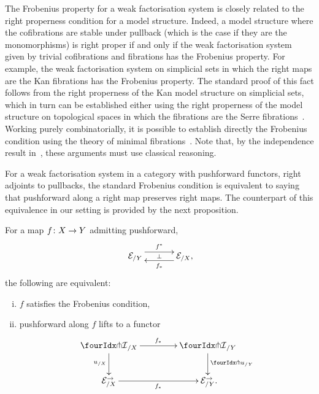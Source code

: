 \documentclass[reqno,10pt,a4paper,oneside,draft]{amsart}
\begin{document}
\begin{remark}
The Frobenius property for a weak factorisation system is closely related to the right properness condition for a model structure.
Indeed, a model structure where the cofibrations are stable under pullback (which is the case if they are the monomorphisms) is right proper if and only if the weak factorisation system given by trivial cofibrations and fibrations has the Frobenius property.
For example, the weak factorisation system on simplicial sets in which the right maps are the Kan fibrations has the Frobenius property.
The standard proof of this fact follows from the right properness of the Kan model structure on simplicial sets, which in turn can be established either using the right properness of the model structure on topological spaces in which the fibrations are the Serre fibrations~\cite[Theorem~13.1.13]{hirschhorn-model-localizations}.
Working purely combinatorially, it is possible to establish directly the Frobenius condition using the theory of minimal fibrations~\cite[Theorem~1.7.1]{joyal-tierney-notes}.
Note that, by the independence result in~\cite{coquand-non-constructivity-kan}, these arguments must use classical reasoning.
\end{remark}

\medskip

For a weak factorisation system in a category with pushforward functors, \ie right adjoints to pullbacks, the standard Frobenius condition is equivalent to saying that pushforward along a right map preserves right maps.
The counterpart of this equivalence in our setting is provided by the next proposition.

\begin{proposition} \label{lift-dependent-product}
For a map $f \colon X \to Y$ admitting pushforward,
\[
\xymatrix@C+1em{
  \catE_{/Y}
  \ar@<5pt>[r]^{f^*}
  \ar@{}[r]|{\bot}
&
  \catE_{/X}
  \ar@<5pt>[l]^{f_*} \rlap{,}
}
\]
the following are equivalent:
\begin{enumerate}[(i)]
\item $f$ satisfies the Frobenius condition,
\item pushforward along $f$ lifts to a functor
\[
\xymatrix@C=1.5cm{
  {\liftr{\cal{I}}}_{/X}
  \ar[r]^{f_*}
  \ar[d]_{u_{/X}}
&
  {\liftr{\cal{I}}}_{/Y}
  \ar[d]^{{\liftr{u}}_{/Y}}
\\
  \catE_{/X}^\to
  \ar[r]_{f_*}
&
  \catE_{/Y}^\to \rlap{.}
}
\]

\end{enumerate}
\end{proposition}
\end{document}
